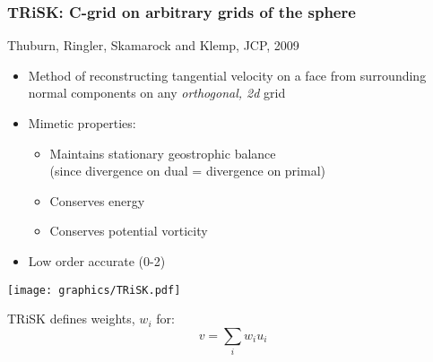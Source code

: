 \begin{frame}
\frametitle{TRiSK: C-grid on arbitrary grids of the sphere}

Thuburn, Ringler, Skamarock and Klemp, JCP, 2009

\begin{itemize}
\item Method of reconstructing tangential velocity on a face from surrounding normal components on any {\em\color{magenta} orthogonal, 2d} grid
\item Mimetic properties:
    \begin{itemize}
    \item Maintains stationary geostrophic balance\\
        (since divergence on dual = divergence on primal)
    \item Conserves energy
    \item Conserves potential vorticity
    \end{itemize}
\item Low order accurate (0-2)
\end{itemize}

\begin{minipage}{0.4\linewidth}
\texttt{[image: graphics/TRiSK.pdf]}
\end{minipage}
\begin{minipage}{0.49\linewidth}\centering
TRiSK defines weights, $w_i$ for:
\[v = \sum_i w_i u_i\]
\end{minipage}
\end{frame}

